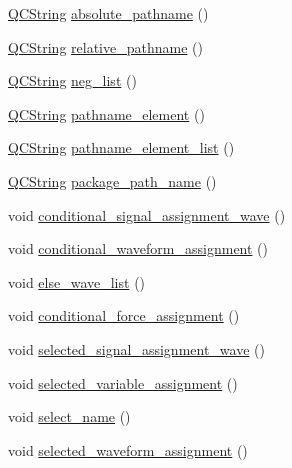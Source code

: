 \begin{DoxyCompactItemize}
\item 
\hyperlink{class_q_c_string}{Q\+C\+String} \hyperlink{classvhdl_1_1parser_1_1_vhdl_parser_a329998cf717286cbfc56b8575ed73db0}{absolute\+\_\+pathname} ()
\item 
\hyperlink{class_q_c_string}{Q\+C\+String} \hyperlink{classvhdl_1_1parser_1_1_vhdl_parser_a85db2471f0dd23c1a34ef2d8d34e5521}{relative\+\_\+pathname} ()
\item 
\hyperlink{class_q_c_string}{Q\+C\+String} \hyperlink{classvhdl_1_1parser_1_1_vhdl_parser_a6f9a28578387baa5b8c2ddc3c4ded20b}{neg\+\_\+list} ()
\item 
\hyperlink{class_q_c_string}{Q\+C\+String} \hyperlink{classvhdl_1_1parser_1_1_vhdl_parser_ab2ea1f2516af5bb733df062dd9df76d7}{pathname\+\_\+element} ()
\item 
\hyperlink{class_q_c_string}{Q\+C\+String} \hyperlink{classvhdl_1_1parser_1_1_vhdl_parser_a817ea101d8da2c774463a5096a0b9c47}{pathname\+\_\+element\+\_\+list} ()
\item 
\hyperlink{class_q_c_string}{Q\+C\+String} \hyperlink{classvhdl_1_1parser_1_1_vhdl_parser_aaa57c1e0efff4eaeab9073871e47d029}{package\+\_\+path\+\_\+name} ()
\item 
void \hyperlink{classvhdl_1_1parser_1_1_vhdl_parser_a8dc688fedd5908e3a4253a8e0b4f3ac5}{conditional\+\_\+signal\+\_\+assignment\+\_\+wave} ()
\item 
void \hyperlink{classvhdl_1_1parser_1_1_vhdl_parser_a119f84853a99f4c18b93cf1f65ae0b34}{conditional\+\_\+waveform\+\_\+assignment} ()
\item 
void \hyperlink{classvhdl_1_1parser_1_1_vhdl_parser_ae2b5fbc5ba14383d55c18f89e713f05b}{else\+\_\+wave\+\_\+list} ()
\item 
void \hyperlink{classvhdl_1_1parser_1_1_vhdl_parser_ac962bf2ab201710bbb7e4a45ef4c9681}{conditional\+\_\+force\+\_\+assignment} ()
\item 
void \hyperlink{classvhdl_1_1parser_1_1_vhdl_parser_abee501eb594ca99a1f8b60a9326a8111}{selected\+\_\+signal\+\_\+assignment\+\_\+wave} ()
\item 
void \hyperlink{classvhdl_1_1parser_1_1_vhdl_parser_a41e8dabce62be2b9ef4aa2a43d12fc8c}{selected\+\_\+variable\+\_\+assignment} ()
\item 
void \hyperlink{classvhdl_1_1parser_1_1_vhdl_parser_a6d83781dc8af2cf82cdb4e6571cb06d5}{select\+\_\+name} ()
\item 
void \hyperlink{classvhdl_1_1parser_1_1_vhdl_parser_a7bcf2019f2c0a5b12c4583a9a0f47eec}{selected\+\_\+waveform\+\_\+assignment} ()

\end{DoxyCompactItemize}
